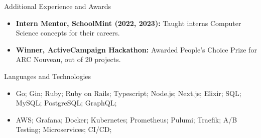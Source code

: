 \documentclass[]{mcdowellcv}
\begin{document}
	\begin{cvsection}{Additional Experience and Awards}
		\begin{cvsubsection}{}{}{}	
			\begin{itemize}
				\item \textbf{Intern Mentor, SchoolMint (2022, 2023):} Taught interns Computer Science concepts for their careers.
				\item \textbf{Winner, ActiveCampaign Hackathon:} Awarded People's Choice Prize for ARC Nouveau, out of 20 projects.
			\end{itemize}
		\end{cvsubsection}
	\end{cvsection}
	\begin{cvsection}{Languages and Technologies}
		\begin{cvsubsection}{}{}{}	
			\begin{itemize}
				\item Go; Gin; Ruby; Ruby on Rails; Typescript; Node.js; Next.js; Elixir; SQL; MySQL; PostgreSQL; GraphQL;
				\item AWS; Grafana; Docker; Kubernetes; Prometheus; Pulumi; Traefik; A/B Testing; Microservices; CI/CD;
			\end{itemize}
		\end{cvsubsection}
	\end{cvsection}
	
\end{document}
